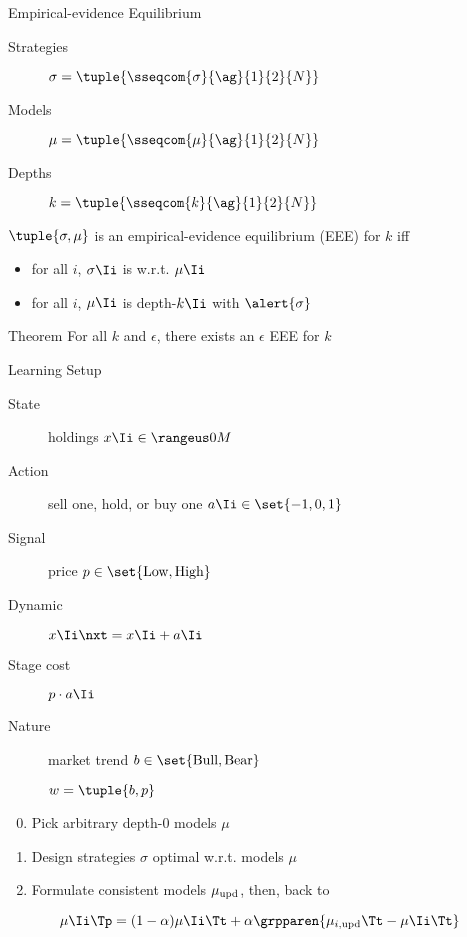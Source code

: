 \begin{frame}{Empirical-evidence Equilibrium}
  \begin{description}
  \item[Strategies]\(\sigma=\tuple{\sseqcom{\sigma}{\ag}{1}{2}{N}}\)
  \item[Models]\(\mu=\tuple{\sseqcom{\mu}{\ag}{1}{2}{N}}\)
  \item[Depths]\(k=\tuple{\sseqcom{k}{\ag}{1}{2}{N}}\)
  \end{description}
  \bigskip

  \begin{definition}
  \(\tuple{\sigma, \mu}\) is an empirical-evidence equilibrium (EEE) for \(k\) iff
  \begin{itemize}
  \item for all \(i\), \(\sigma\Ii\) is  w.r.t. \(\mu\Ii\)
  \item for all \(i\), \(\mu\Ii\) is depth-\(k\Ii\)  with \(\alert{\sigma}\)
  \end{itemize}
  \end{definition}

  \bigskip
  \begin{block}{Theorem}
  For all \(k\) and \(\epsilon\), there exists an \(\epsilon\) EEE for \(k\)
  \end{block}
\end{frame}
\begin{frame}{Learning Setup}
  \begin{description}
    \item[State] holdings \(x\Ii \in \range{0}{M}\)
    \item[Action] sell one, hold, or buy one \(a\Ii \in \set{-1, 0, 1}\)
    \item[Signal] price \(p \in \set{\textnormal{Low}, \textnormal{High}}\)
    \item[Dynamic] \(x\Ii\nxt = x\Ii + a\Ii\)
    \item[Stage cost] \(p \cdot a\Ii\)
    \item[Nature] market trend \(b \in \set{\textnormal{Bull}, \textnormal{Bear}}\)

      \(w = \tuple{b, p}\)
  \end{description}

  \begin{enumerate}
    \setcounter{enumi}{-1}
    \item Pick arbitrary depth-\(0\) models \(\mu\)
    \item Design strategies \(\sigma\) optimal w.r.t. models \(\mu\)
    \item Formulate consistent models \(\mu_{\textnormal{upd}}\), then, back to 
  \end{enumerate}

  \[\mu\Ii\Tp = (1 - \alpha) \mu\Ii\Tt + \alpha \grpparen{\mu_{i,\textnormal{upd}}\Tt - \mu\Ii\Tt}\]

\end{frame}
